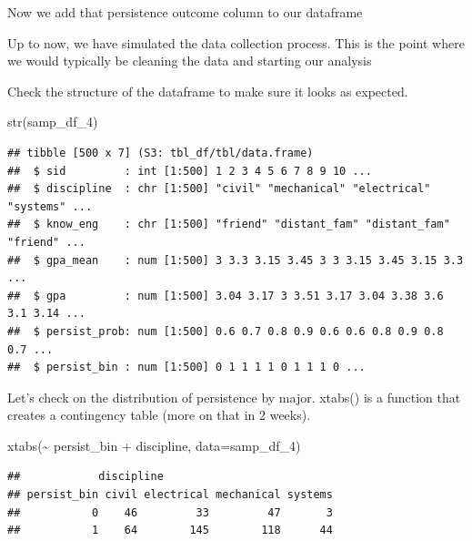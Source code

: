 \documentclass[
]{book}
\newenvironment{Shaded}{\begin{snugshade}}{\end{snugshade}}
\newcommand{\AttributeTok}[1]{\textcolor[rgb]{0.77,0.63,0.00}{#1}}
\newcommand{\FunctionTok}[1]{\textcolor[rgb]{0.00,0.00,0.00}{#1}}
\newcommand{\NormalTok}[1]{#1}
\newcommand{\OtherTok}[1]{\textcolor[rgb]{0.56,0.35,0.01}{#1}}
\newcommand{\SpecialCharTok}[1]{\textcolor[rgb]{0.00,0.00,0.00}{#1}}
\begin{document}
Now we add that persistence outcome column to our dataframe

\begin{Shaded}
\end{Shaded}

Up to now, we have simulated the data collection process. This is the point where we would typically be cleaning the data and starting our analysis

Check the structure of the dataframe to make sure it looks as expected.

\begin{Shaded}
\begin{Highlighting}[]
\FunctionTok{str}\NormalTok{(samp\_df\_4)}
\end{Highlighting}
\end{Shaded}

\begin{verbatim}
## tibble [500 x 7] (S3: tbl_df/tbl/data.frame)
##  $ sid         : int [1:500] 1 2 3 4 5 6 7 8 9 10 ...
##  $ discipline  : chr [1:500] "civil" "mechanical" "electrical" "systems" ...
##  $ know_eng    : chr [1:500] "friend" "distant_fam" "distant_fam" "friend" ...
##  $ gpa_mean    : num [1:500] 3 3.3 3.15 3.45 3 3 3.15 3.45 3.15 3.3 ...
##  $ gpa         : num [1:500] 3.04 3.17 3 3.51 3.17 3.04 3.38 3.6 3.1 3.14 ...
##  $ persist_prob: num [1:500] 0.6 0.7 0.8 0.9 0.6 0.6 0.8 0.9 0.8 0.7 ...
##  $ persist_bin : num [1:500] 0 1 1 1 1 0 1 1 1 0 ...
\end{verbatim}

Let's check on the distribution of persistence by major. xtabs() is a function that creates a contingency table (more on that in 2 weeks).

\begin{Shaded}
\begin{Highlighting}[]
\FunctionTok{xtabs}\NormalTok{(}\SpecialCharTok{\textasciitilde{}}\NormalTok{ persist\_bin }\SpecialCharTok{+}\NormalTok{ discipline, }\AttributeTok{data=}\NormalTok{samp\_df\_4)}
\end{Highlighting}
\end{Shaded}

\begin{verbatim}
##            discipline
## persist_bin civil electrical mechanical systems
##           0    46         33         47       3
##           1    64        145        118      44
\end{verbatim}
\end{document}
